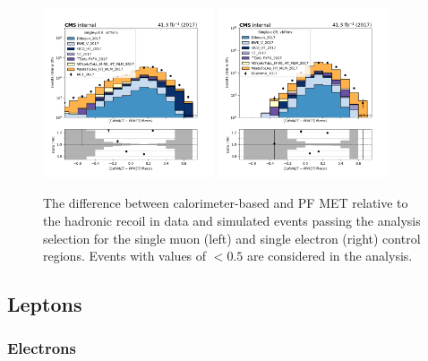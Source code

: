 \begin{figure}[htbp]
  \centering
        \includegraphics[width=0.45\textwidth]{fig/datamc/cr_1m_vbf/cr_1m_vbf_dpfcalo_2017.png}
        \includegraphics[width=0.45\textwidth]{fig/datamc/cr_1e_vbf/cr_1e_vbf_dpfcalo_2017.png}
  \caption{The difference between calorimeter-based and PF MET relative to the hadronic recoil
in data and simulated events passing the analysis selection for the single muon (left) and
single electron (right) control regions. Events with values of $< 0.5$ are considered in
the analysis.}
  \label{fig:calomet_pfmet}
\end{figure}

\subsection{Leptons}

\subsubsection{Electrons}


